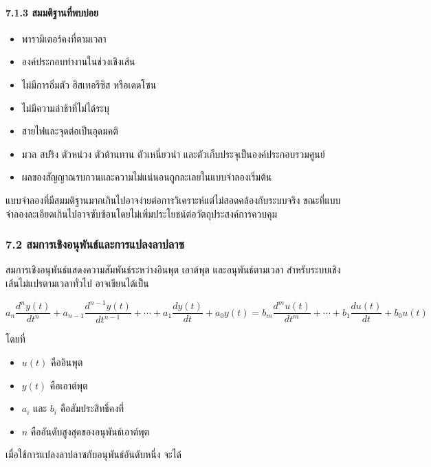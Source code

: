 \paragraph{7.1.3 สมมติฐานที่พบบ่อย}

\begin{itemize}
    \item พารามิเตอร์คงที่ตามเวลา
    \item องค์ประกอบทำงานในช่วงเชิงเส้น
    \item ไม่มีการอิ่มตัว ฮิสเทอรีซิส หรือเดดโซน
    \item ไม่มีความล่าช้าที่ไม่ได้ระบุ
    \item สายไฟและจุดต่อเป็นอุดมคติ
    \item มวล สปริง ตัวหน่วง ตัวต้านทาน ตัวเหนี่ยวนำ และตัวเก็บประจุเป็นองค์ประกอบรวมศูนย์
    \item ผลของสัญญาณรบกวนและความไม่แน่นอนถูกละเลยในแบบจำลองเริ่มต้น
\end{itemize}

แบบจำลองที่มีสมมติฐานมากเกินไปอาจง่ายต่อการวิเคราะห์แต่ไม่สอดคล้องกับระบบจริง ขณะที่แบบจำลองละเอียดเกินไปอาจซับซ้อนโดยไม่เพิ่มประโยชน์ต่อวัตถุประสงค์การควบคุม


\subsubsection{7.2 สมการเชิงอนุพันธ์และการแปลงลาปลาซ}

สมการเชิงอนุพันธ์แสดงความสัมพันธ์ระหว่างอินพุต เอาต์พุต และอนุพันธ์ตามเวลา สำหรับระบบเชิงเส้นไม่แปรตามเวลาทั่วไป อาจเขียนได้เป็น

\[
a_n\frac{d^n y(t)}{dt^n}+a_{n-1}\frac{d^{n-1}y(t)}{dt^{n-1}}+\cdots+a_1\frac{dy(t)}{dt}+a_0y(t)
=
b_m\frac{d^m u(t)}{dt^m}+\cdots+b_1\frac{du(t)}{dt}+b_0u(t)
\]

โดยที่

\begin{itemize}
    \item $u(t)$ คืออินพุต
    \item $y(t)$ คือเอาต์พุต
    \item $a_i$ และ $b_i$ คือสัมประสิทธิ์คงที่
    \item $n$ คืออันดับสูงสุดของอนุพันธ์เอาต์พุต
\end{itemize}

เมื่อใช้การแปลงลาปลาซกับอนุพันธ์อันดับหนึ่ง จะได้


